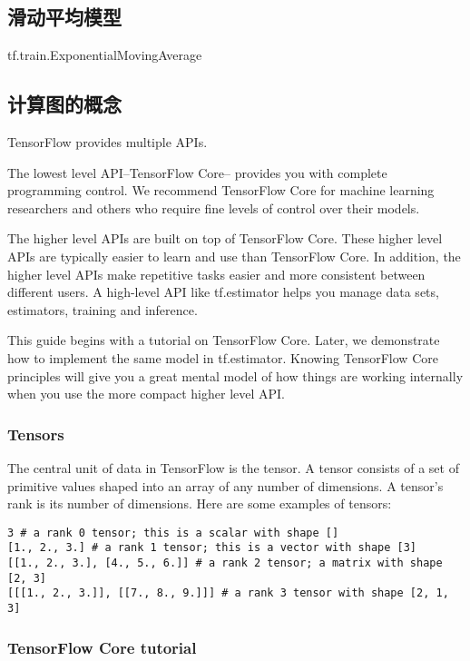 \subsection{滑动平均模型}
tf.train.ExponentialMovingAverage



\subsection{计算图的概念}
TensorFlow provides multiple APIs.

The lowest level API--TensorFlow Core-- provides you with complete programming control. We recommend TensorFlow Core for machine learning researchers and others who require fine levels of control over their models.

The higher level APIs are built on top of TensorFlow Core. These higher level APIs are typically easier to learn and use than TensorFlow Core. In addition, the higher level APIs make repetitive tasks easier and more consistent between different users. A high-level API like tf.estimator helps you manage data sets, estimators, training and inference.

This guide begins with a tutorial on TensorFlow Core. Later, we demonstrate how to implement the same model in tf.estimator. Knowing TensorFlow Core principles will give you a great mental model of how things are working internally when you use the more compact higher level API.

\subsubsection{Tensors}
The central unit of data in TensorFlow is the tensor. A tensor consists of a set of primitive values shaped into an array of any number of dimensions. A tensor's rank is its number of dimensions. Here are some examples of tensors:

\begin{verbatim}
3 # a rank 0 tensor; this is a scalar with shape []
[1., 2., 3.] # a rank 1 tensor; this is a vector with shape [3]
[[1., 2., 3.], [4., 5., 6.]] # a rank 2 tensor; a matrix with shape [2, 3]
[[[1., 2., 3.]], [[7., 8., 9.]]] # a rank 3 tensor with shape [2, 1, 3]
\end{verbatim}


\subsubsection{TensorFlow Core tutorial}

